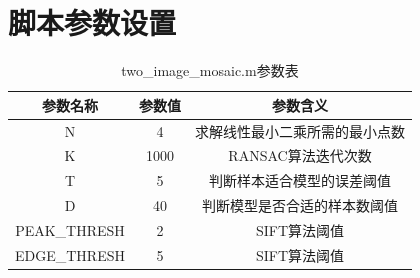 \documentclass[a4paper, UTF8]{ctexrep}
\begin{document}
  \section{脚本参数设置}
	\begin{table}[htbp!]
	\centering
	\begin{tabular}{ccc}
	\hline
	参数名称 & 参数值 & 参数含义 \\
	\hline
	N & 4 & 求解线性最小二乘所需的最小点数 \\
	K & 1000 & RANSAC算法迭代次数 \\
	T & 5 & 判断样本适合模型的误差阈值 \\
	D & 40 & 判断模型是否合适的样本数阈值 \\
	PEAK\_THRESH & 2 & SIFT算法阈值 \\
	EDGE\_THRESH & 5 & SIFT算法阈值 \\
	\hline
	\end{tabular}
	\caption{two\_image\_mosaic.m参数表}
	\end{table}
\end{document}
